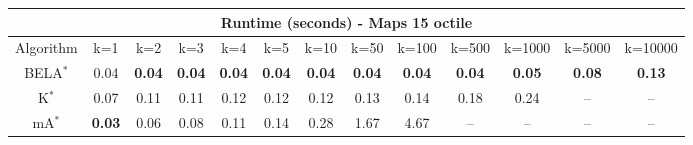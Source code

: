 \begin{tabular}{c|cccccccccccc}\toprule
\multicolumn{13}{c}{Runtime (seconds) - Maps 15 octile}\\ \midrule
Algorithm & k=1 & k=2 & k=3 & k=4 & k=5 & k=10 & k=50 & k=100 & k=500 & k=1000 & k=5000 & k=10000 \\ \midrule
BELA$^*$ & 0.04 & \textbf{0.04} & \textbf{0.04} & \textbf{0.04} & \textbf{0.04} & \textbf{0.04} & \textbf{0.04} & \textbf{0.04} & \textbf{0.04} & \textbf{0.05} & \textbf{0.08} & \textbf{0.13} \\
K$^*$ & 0.07 & 0.11 & 0.11 & 0.12 & 0.12 & 0.12 & 0.13 & 0.14 & 0.18 & 0.24 & -- & -- \\
mA$^*$ & \textbf{0.03} & 0.06 & 0.08 & 0.11 & 0.14 & 0.28 & 1.67 & 4.67 & -- & -- & -- & -- \\ \bottomrule 
\end{tabular}
